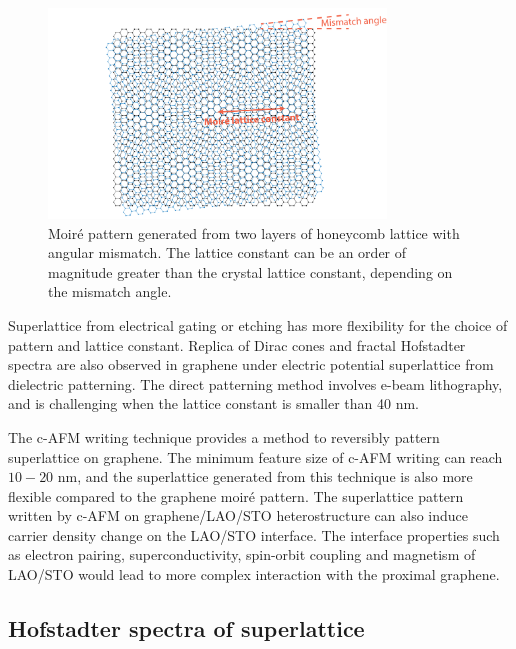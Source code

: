 \documentclass[pdflatex, sectionletters, 12pt]{pittetd}    %
\begin{document}
\begin{figure}[h!]
	\centering
	\includegraphics[width=0.8\textwidth]{Drawing/Moire.pdf}
	\caption{Moir{\'e} pattern generated from two layers of honeycomb lattice with angular mismatch. The lattice constant can be an order of magnitude greater than the crystal lattice constant, depending on the mismatch angle.}
	\label{FIG:Moire}
\end{figure}

Superlattice from electrical gating\cite{forsythe2018band} or etching\cite{jessen2019lithographic} has more flexibility for the choice of pattern and lattice constant. Replica of Dirac cones and fractal Hofstadter spectra are also observed in graphene under electric potential superlattice from dielectric patterning\cite{forsythe2018band}. The direct patterning method involves e-beam lithography, and is challenging when the lattice constant is smaller than 40 nm.

The c-AFM writing technique provides a method to reversibly pattern superlattice on graphene. The minimum feature size of c-AFM writing can reach $10-20$ nm\cite{huang2015electric}, and the superlattice generated from this technique is also more flexible compared to the graphene moir{\'e} pattern. The superlattice pattern written by c-AFM on graphene/LAO/STO heterostructure can also induce carrier density change on the LAO/STO interface\cite{huang2015electric}. The interface properties such as electron pairing\cite{cheng2015electron}, superconductivity\cite{reyren2007superconducting}, spin-orbit coupling\cite{caviglia2010tunable, zhong2013theory} and magnetism\cite{bi2014room} of LAO/STO would lead to more complex interaction with the proximal graphene.

\subsection{Hofstadter spectra of superlattice}
\end{document}
